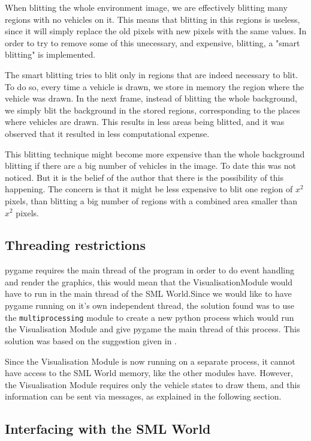When blitting the whole environment image, we are effectively blitting many regions with no vehicles on it. This means that blitting in this regions is useless, since it will simply replace the old pixels with new pixels with the same values. In order to try to remove some of this unecessary, and expensive, blitting, a "smart blitting" is implemented. 

The smart blitting tries to blit only in regions that are indeed necessary to blit. To do so, every time a vehicle is drawn, we store in memory the region where the vehicle was drawn. In the next frame, instead of blitting the whole background, we simply blit the background in the stored regions, corresponding to the places where vehicles are drawn. This results in less areas being blitted, and it was observed that it resulted in less computational expense.

This blitting technique might become more expensive than the whole background blitting if there are a big number of vehicles in the image. To date this was not noticed. But it is the belief of the author that there is the possibility of this happening. The concern is that it might be less expensive to blit one region of $x^2$ pixels, than blitting a big number of regions with a combined area smaller than $x^2$ pixels.

\subsection{Threading restrictions}
\label{visualisation_module:threading_restrictions}

pygame requires the main thread of the program in order to do event handling and render the graphics, this would mean that the VisualisationModule would have to run in the main thread of the SML World.Since we would like to have pygame running on it's own independent thread, the solution found was to use the \texttt{multiprocessing} module to create a new python process which would run the Visualisation Module and give pygame the main thread of this process. This solution was based on the suggestion given in \cite{pygame_threading}.

Since the Visualisation Module is now running on a separate process, it cannot have access to the SML World memory, like the other modules have. However, the Visualisation Module requires only the vehicle states to draw them, and this information can be sent via messages, as explained in the following section.

\subsection{Interfacing with the SML World}

